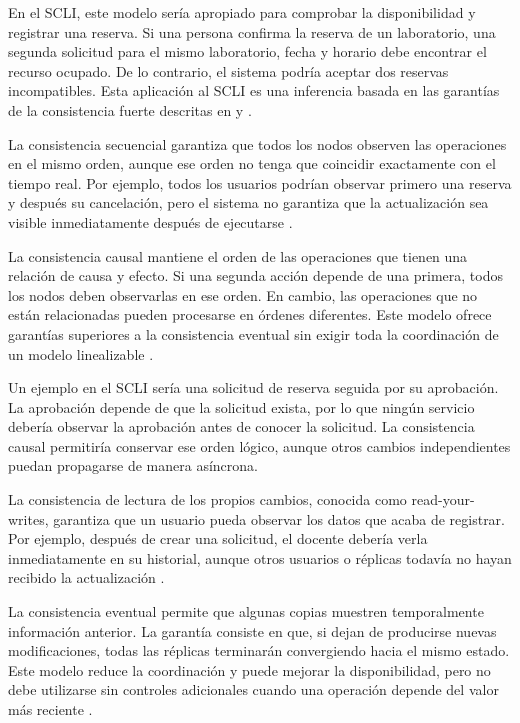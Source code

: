 \documentclass[conference]{IEEEtran}
\begin{document}
En el SCLI, este modelo sería apropiado para comprobar la disponibilidad y registrar una reserva. Si una persona confirma la reserva de un laboratorio, una segunda solicitud para el mismo laboratorio, fecha y horario debe encontrar el recurso ocupado. De lo contrario, el sistema podría aceptar dos reservas incompatibles. Esta aplicación al SCLI es una inferencia basada en las garantías de la consistencia fuerte descritas en \cite{ref1} y \cite{ref4}.

La consistencia secuencial garantiza que todos los nodos observen las operaciones en el mismo orden, aunque ese orden no tenga que coincidir exactamente con el tiempo real. Por ejemplo, todos los usuarios podrían observar primero una reserva y después su cancelación, pero el sistema no garantiza que la actualización sea visible inmediatamente después de ejecutarse \cite{ref1}.

La consistencia causal mantiene el orden de las operaciones que tienen una relación de causa y efecto. Si una segunda acción depende de una primera, todos los nodos deben observarlas en ese orden. En cambio, las operaciones que no están relacionadas pueden procesarse en órdenes diferentes. Este modelo ofrece garantías superiores a la consistencia eventual sin exigir toda la coordinación de un modelo linealizable \cite{ref1,ref3}.

Un ejemplo en el SCLI sería una solicitud de reserva seguida por su aprobación. La aprobación depende de que la solicitud exista, por lo que ningún servicio debería observar la aprobación antes de conocer la solicitud. La consistencia causal permitiría conservar ese orden lógico, aunque otros cambios independientes puedan propagarse de manera asíncrona.

La consistencia de lectura de los propios cambios, conocida como read-your-writes, garantiza que un usuario pueda observar los datos que acaba de registrar. Por ejemplo, después de crear una solicitud, el docente debería verla inmediatamente en su historial, aunque otros usuarios o réplicas todavía no hayan recibido la actualización \cite{ref1}.

La consistencia eventual permite que algunas copias muestren temporalmente información anterior. La garantía consiste en que, si dejan de producirse nuevas modificaciones, todas las réplicas terminarán convergiendo hacia el mismo estado. Este modelo reduce la coordinación y puede mejorar la disponibilidad, pero no debe utilizarse sin controles adicionales cuando una operación depende del valor más reciente \cite{ref1,ref4}.
\end{document}
